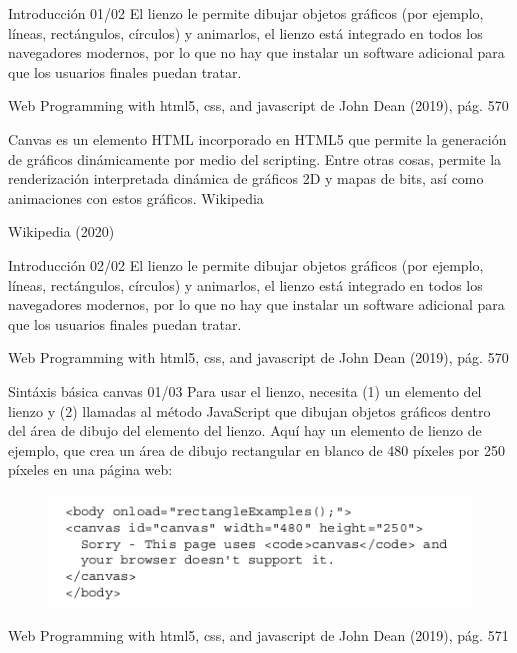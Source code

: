 \begin{frame}{Introducción 01/02}
\justifying
El lienzo le permite dibujar objetos gráficos (por ejemplo, líneas, rectángulos, círculos) y animarlos, el lienzo está integrado en todos los navegadores modernos, por lo que no hay que instalar un software adicional para que los usuarios finales puedan tratar.

{\tiny Web Programming with html5, css, and javascript de John Dean (2019), pág. 570}

Canvas es un elemento HTML incorporado en HTML5 que permite la generación de gráficos dinámicamente por medio del scripting. Entre otras cosas, permite la renderización interpretada dinámica de gráficos 2D y mapas de bits, así como animaciones con estos gráficos. Wikipedia

{\tiny Wikipedia (2020)}
\end{frame}

\begin{frame}{Introducción 02/02}
\justifying
El lienzo le permite dibujar objetos gráficos (por ejemplo, líneas, rectángulos, círculos) y animarlos, el lienzo está integrado en todos los navegadores modernos, por lo que no hay que instalar un software adicional para que los usuarios finales puedan tratar.

{\tiny Web Programming with html5, css, and javascript de John Dean (2019), pág. 570}
\end{frame}

\begin{frame}{Sintáxis básica canvas 01/03}
\justifying
Para usar el lienzo, necesita (1) un elemento del lienzo y (2) llamadas al método JavaScript que dibujan objetos gráficos dentro del área de dibujo del elemento del lienzo. Aquí hay un elemento de lienzo de ejemplo, que crea un área de dibujo rectangular en blanco de 480 píxeles por 250 píxeles en una página web:

\begin{figure}[H]
\centering
\includegraphics[scale=0.5]{Section_Files/images/Sec01/01.png}
\end{figure}


{\tiny Web Programming with html5, css, and javascript de John Dean (2019), pág. 571}
\end{frame}

